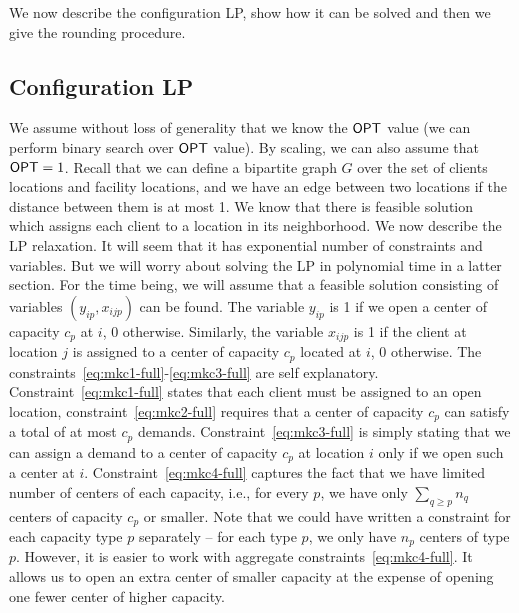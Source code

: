 We now describe 
the configuration LP, show how it can be solved and then we give the rounding procedure. 


\subsection{Configuration LP}
\label{sec:lp}
We assume without loss of generality that we know the $\mathsf{OPT}$ value (we can perform binary search over $\mathsf{OPT}$ value). By scaling, we can also assume that
 $\mathsf{OPT} = 1$. Recall that we can define a bipartite graph $G$ over the set of clients locations and facility locations, and we have an edge between
 two locations if the distance between them is at most 1. We know that there is feasible solution which assigns each client to a location in its neighborhood.
 We now describe the LP relaxation. It will seem that it has exponential number of constraints and variables. But we will worry about solving the LP in polynomial time in a latter section. For the time being, we will assume that a feasible solution consisting of variables
 $(y_{ip}, x_{ijp})$  can be found.
  The variable $y_{ip}$ is 1 if we open a
center of capacity $c_p$ at $i$, 0 otherwise. Similarly, the variable $x_{ijp}$ is 1 if the client at location $j$ is assigned to a center of capacity $c_p$ located at $i$, 0 otherwise. The constraints~\eqref{eq:mkc1-full}-\eqref{eq:mkc3-full} are self explanatory. Constraint~\eqref{eq:mkc1-full} states that each client must be assigned to an open location, constraint~\eqref{eq:mkc2-full} requires that a center of capacity $c_p$ can satisfy a total of at most
$c_p$ demands. Constraint~\eqref{eq:mkc3-full} is simply stating that we can assign a demand to a center of capacity $c_p$ at location $i$ only if we open such a center at $i$. Constraint~\eqref{eq:mkc4-full} captures the fact that we have limited number of centers of each capacity, i.e., for
every $p$, we have only $\sum_{q \geq p} n_q$ centers of capacity $c_p$ or smaller. Note that we could have written a constraint for each capacity type $p$ separately -- for each type $p$, we only have $n_p$ centers of type $p$. However, it is easier to work with aggregate constraints~\eqref{eq:mkc4-full}. It allows us to open an extra center of smaller capacity at the expense of opening one fewer center of higher capacity.

